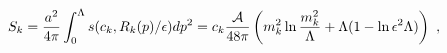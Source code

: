 \begin{equation}\label{3.4}
S_k={a^2 \over 4\pi} \int_0^\Lambda
s(c_k,R_k(p)/\epsilon)dp^2=
c_k{{\cal A} \over 48\pi}\left(m_k^2\ln {m_k^2 \over \Lambda}
+\Lambda(1-\ln\epsilon ^2 \Lambda )\right)
~,
\end{equation}

